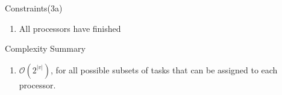 \documentclass[10pt]{beamer}
\begin{document}
\begin{frame}{Constraints(3a)}
    \begin{enumerate}
        \item All processors have finished
        
    \end{enumerate}
    
\end{frame}



\begin{frame}{Complexity Summary}
    \begin{enumerate}
        \item $\mathcal{O}(2^{|v|})$, for all possible subsets of tasks that can be assigned to each processor.
    \end{enumerate}
\end{frame}
\end{document}
